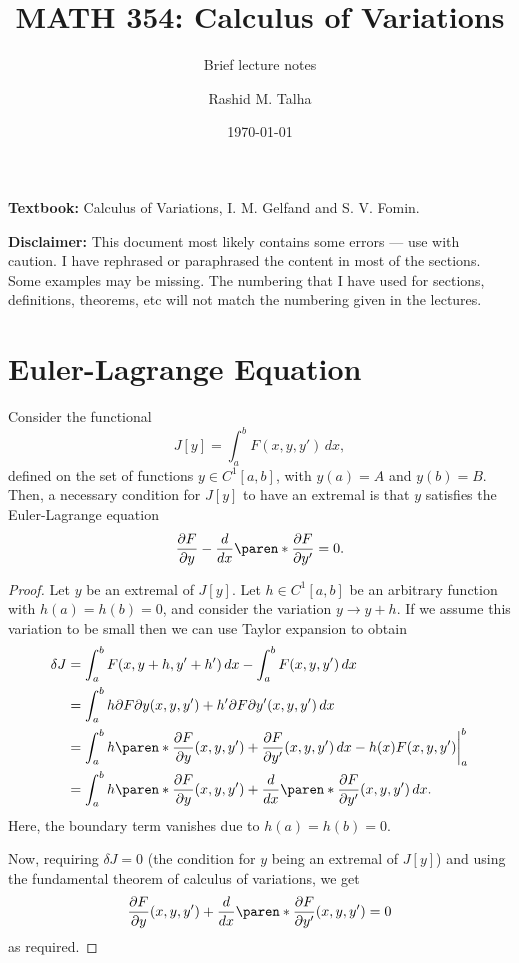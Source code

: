 \documentclass[11pt]{penrose}
\title{MATH 354: Calculus of Variations}
\subtitle{Brief lecture notes}
\author{Rashid M. Talha}
\affiliation{School of Natural Sciences, NUST}
\date{\today}
\begin{document}
\maketitle

\textbf{Textbook:} Calculus of Variations, I. M. Gelfand and S. V. Fomin.

\textbf{Disclaimer:} This document most likely contains some errors --- use with caution. I have rephrased or paraphrased the content in most of the sections. Some examples may be missing. The numbering that I have used for sections, definitions, theorems, etc will not match the numbering given in the lectures.

\section{Euler-Lagrange Equation}
\begin{nthm}
    Consider the functional
    \begin{equation}
        J[y] = \int_{a}^{b} F(x, y, y') \,dx,
    \end{equation}
    defined on the set of functions $y \in C^{1}[a,b]$, with $y(a) = A$ and $y(b) = B$. Then, a necessary condition for $J[y]$ to have an extremal is that $y$ satisfies the Euler-Lagrange equation
    \begin{equation}
        \frac{\pd F}{\pd y} - \frac{d}{dx} \paren*{\frac{\pd F}{\pd y'}} = 0.
        \label{eq:el-basic}
    \end{equation}
\end{nthm}
\begin{proof}
    Let $y$ be an extremal of $J[y]$. Let $h \in C^1 [a,b]$ be an arbitrary function with $h(a)=h(b)=0$, and consider the variation $y \to y+h$. If we assume this variation to be small then we can use Taylor expansion to obtain
    \begin{align}
        \delta J
        &= \int_{a}^{b} F(x, y+h, y'+h') \,dx - \int_{a}^{b} F(x, y, y') \,dx\\
        &= \int_{a}^{b} h {\pd F}{\pd y}(x, y, y') + h' {\pd F}{\pd y'}(x, y, y') \,dx\\
        &= \int_{a}^{b} h \paren*{ \frac{\pd F}{\pd y}(x, y, y') + \frac{\pd F}{\pd y'}(x, y, y') } \,dx - \bigg. h(x) F(x, y, y') \bigg|_a^b\\
        &= \int_{a}^{b} h \paren*{ \frac{\pd F}{\pd y}(x, y, y') + \frac{d}{dx} \paren*{ \frac{\pd F}{\pd y'}(x, y, y')} } \,dx.
    \end{align}
    Here, the boundary term vanishes due to $h(a)=h(b)=0$.

    Now, requiring $\delta J = 0$ (the condition for $y$ being an extremal of $J[y]$) and using the fundamental theorem of calculus of variations, we get
    \begin{equation}
        \frac{\pd F}{\pd y}(x, y, y') + \frac{d}{dx} \paren*{ \frac{\pd F}{\pd y'}(x, y, y')} = 0
    \end{equation}
    as required.
\end{proof}
\end{document}

